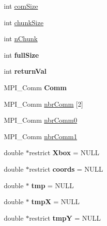 \begin{DoxyCompactItemize}
\item 
int \mbox{\hyperlink{classPencilDcmp_aadefb86246eafd53011fe4d369922ab6}{com\+Size}}
\item 
int \mbox{\hyperlink{classPencilDcmp_a44102096e8239b752fe1d39f3d8fd203}{chunk\+Size}}
\item 
int \mbox{\hyperlink{classPencilDcmp_a1f7f54dbd7adbfd03d171c72cbae865e}{n\+Chunk}}
\item 
\mbox{\label{classPencilDcmp_a29aa6ccd98a43fea50a375d60aa1e8c6}} 
int {\bfseries full\+Size}
\item 
\mbox{\label{classPencilDcmp_ac487332ebd9a1ac370acea04d10dae6b}} 
int {\bfseries return\+Val}
\item 
\mbox{\label{classPencilDcmp_a06280573341b5fa1031b504d4ea79a3c}} 
M\+P\+I\+\_\+\+Comm {\bfseries Comm}
\item 
M\+P\+I\+\_\+\+Comm \mbox{\hyperlink{classPencilDcmp_a04ce960d67858cb869c100789e72be95}{nbr\+Comm}} \mbox{[}2\mbox{]}
\item 
M\+P\+I\+\_\+\+Comm \mbox{\hyperlink{classPencilDcmp_a96b154d85babab87ec4373273ad9a4a1}{nbr\+Comm0}}
\item 
M\+P\+I\+\_\+\+Comm \mbox{\hyperlink{classPencilDcmp_a708235c4b590cb76e8b88b5073828f25}{nbr\+Comm1}}
\item 
\mbox{\label{classPencilDcmp_a7ae002bef32961c44115d65683f87ff8}} 
double $\ast$restrict {\bfseries Xbox} = N\+U\+LL
\item 
\mbox{\label{classPencilDcmp_aaf91706afcda17921e1735f1bf1e5d95}} 
double $\ast$restrict {\bfseries coords} = N\+U\+LL
\item 
\mbox{\label{classPencilDcmp_ad942c591e34364464f4d9cce19b3dc21}} 
double $\ast$ {\bfseries tmp} = N\+U\+LL
\item 
\mbox{\label{classPencilDcmp_a2bbbc886f9e41d36c96482de3fe23d5e}} 
double $\ast$ {\bfseries tmpX} = N\+U\+LL
\item 
\mbox{\label{classPencilDcmp_a74de5785b5585811170b31dde71dc4f9}} 
double $\ast$restrict {\bfseries tmpY} = N\+U\+LL
\item 

\end{DoxyCompactItemize}
